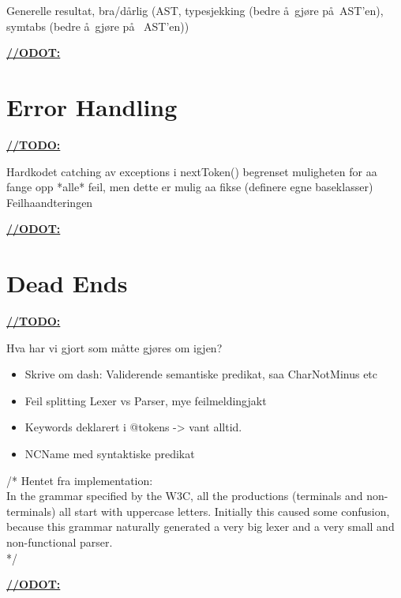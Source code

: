 Generelle resultat, bra/d\aa rlig (AST, typesjekking (bedre \aa~gj\o re p\aa~AST'en),
symtabs (bedre \aa~gj\o re p\aa~ AST'en))

\underline{\textbf{\LARGE //ODOT:}}

\section{Error Handling}
\underline{\textbf{\LARGE //TODO:}}

Hardkodet catching av exceptions i nextToken() begrenset muligheten for aa
fange opp *alle* feil, men dette er mulig aa fikse (definere egne baseklasser)
Feilhaandteringen

\underline{\textbf{\LARGE //ODOT:}}

\section{Dead Ends}
\underline{\textbf{\LARGE //TODO:}}

Hva har vi gjort som m\aa tte gj\o res om igjen?

\begin{itemize}
\item Skrive om dash: Validerende semantiske predikat, saa CharNotMinus etc
\item Feil splitting Lexer vs Parser, mye feilmeldingjakt
\item Keywords deklarert i @tokens -> vant alltid.
\item NCName med syntaktiske predikat
\end{itemize}

/* Hentet fra implementation: \\
In the grammar specified by the W3C, all the productions (terminals and
non-terminals) all start with uppercase letters. Initially this caused some
confusion, because this grammar naturally generated a very big lexer and a very
small and non-functional parser. \\
*/

\underline{\textbf{\LARGE //ODOT:}}


